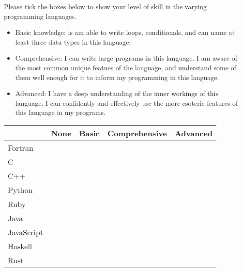 %
%
Please tick the boxes below to show your level of skill in the varying programming languages.

\begin{itemize}
  \item Basic knowledge: is am able to write loops, conditionals, and can name at least three data types in this language.
  \item {Comprehensive:} I can write large programs in this language. I am aware of the most common unique featues of the language, and understand some of them well enough for it to inform my programming in this language.
  \item {Advanced:} I have a deep understanding of the inner workings of this language. I can confidently and effectively use the more esoteric features of this language in my programs.

\end{itemize}

\begin{center}
\begin{tabular}{|l|c|c|c|c|}
\hline
& None & Basic & Comprehensive & Advanced \\ \hline
Fortran & & & & \\ \hline
C & & & & \\ \hline
C++ & & & & \\ \hline
Python & & & & \\ \hline
Ruby & & & & \\ \hline
Java & & & & \\ \hline
JavaScript & & & & \\ \hline
Haskell & & & & \\ \hline
Rust  & & & & \\ \hline
\end{tabular}
\end{center}

